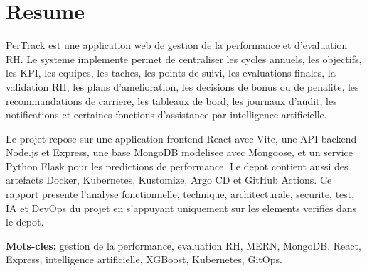 \chapter*{Resume}
PerTrack est une application web de gestion de la performance et d'evaluation RH. Le systeme implemente permet de centraliser les cycles annuels, les objectifs, les KPI, les equipes, les taches, les points de suivi, les evaluations finales, la validation RH, les plans d'amelioration, les decisions de bonus ou de penalite, les recommandations de carriere, les tableaux de bord, les journaux d'audit, les notifications et certaines fonctions d'assistance par intelligence artificielle.

Le projet repose sur une application frontend React avec Vite, une API backend Node.js et Express, une base MongoDB modelisee avec Mongoose, et un service Python Flask pour les predictions de performance. Le depot contient aussi des artefacts Docker, Kubernetes, Kustomize, Argo CD et GitHub Actions. Ce rapport presente l'analyse fonctionnelle, technique, architecturale, securite, test, IA et DevOps du projet en s'appuyant uniquement sur les elements verifies dans le depot.

\textbf{Mots-cles:} gestion de la performance, evaluation RH, MERN, MongoDB, React, Express, intelligence artificielle, XGBoost, Kubernetes, GitOps.
\clearpage
